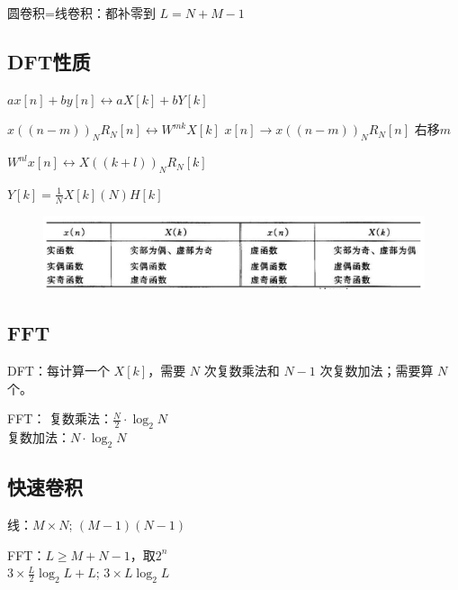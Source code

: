 圆卷积=线卷积：都补零到 $L=N+M-1$

\subsection{DFT性质}

\begin{description}
\tightlist
\item[线性] $ax[n]+by[n]\leftrightarrow aX[k]+bY[k]$

\item[圆移位] $x((n-m))_NR_N[n]\longleftrightarrow W^{mk}X[k]$
$x[n]\longrightarrow x((n-m))_NR_N[n]$ 右移\(m\)

\item[频域圆移位]
$W^{nl}x[n]\longleftrightarrow X((k+l))_NR_N[k]$

\item[频域圆卷积]
$Y[k] = \frac{1}{N}X[k](N)H[k]$
\end{description}
\vspace{-10pt}
\begin{figure}[H]
    \centering
    \includegraphics[width=\linewidth]{figure/dft.png}
\end{figure}
\vspace{-10pt}



\subsection{FFT}

DFT：每计算一个 $X[k]$，需要 $N$ 次复数乘法和 $N-1$ 次复数加法；需要算 \(N\) 个。

FFT：
复数乘法：\(\frac{N}{2}\cdot \log_2{N}\)\\
复数加法：\(N\cdot \log_2N\)

\subsection{快速卷积}
线：\(M\times N\); \((M-1)(N-1)\)

FFT：\(L\geq M+N-1\)，取\(2^n\)\\
\(3\times\frac{L}{2}\log_2{L}+L\); \(3\times L\log_2{L}\)


